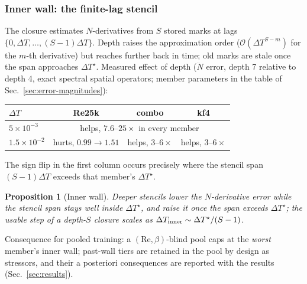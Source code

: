 \documentclass[11pt]{article}
\theoremstyle{plain}
\newtheorem{proposition}{Proposition}
\theoremstyle{definition}
\newcommand{\Nddot}{\ddot{N}}
\newcommand{\bO}{\mathcal{O}}
\newcommand{\DT}{\Delta T}
\newcommand{\DTs}{\Delta T^{\star}}
\begin{document}
\subsubsection{Inner wall: the finite-lag stencil}
\label{sec:inner-wall}
The closure estimates $N$-derivatives from $S$ stored marks at lags
$\{0,\DT,\dots,(S-1)\DT\}$. Depth raises the approximation order
($\bO(\DT^{S-m})$ for the $m$-th derivative) but reaches further back in time;
old marks are stale once the span approaches $\DTs$. Measured effect of
depth ($\Nddot$ error, depth 7 relative to depth 4, exact spectral spatial
operators; member parameters in the table of
Sec.~\ref{sec:error-magnitudes}):
\begin{center}\small
\begin{tabular}{lccc}
\toprule
$\DT$ & Re25k & combo & kf4\\
\midrule
$5\times10^{-3}$   & \multicolumn{3}{c}{helps, $7.6$--$25\times$ in every member}\\
$1.5\times10^{-2}$ & hurts, $0.99\to1.51$ & helps, $3$--$6\times$ & helps, $3$--$6\times$\\
\bottomrule
\end{tabular}
\end{center}
The sign flip in the first column occurs precisely where the stencil span
$(S{-}1)\DT$ exceeds that member's $\DTs$.

\begin{proposition}[Inner wall]
\label{prop:inner}
Deeper stencils lower the $N$-derivative error while the stencil span stays
well inside $\DTs$, and raise it once the span exceeds $\DTs$; the usable step
of a depth-$S$ closure scales as $\DT_{\rm inner}\sim\DTs/(S-1)$.
\end{proposition}
\noindent Consequence for pooled training: a $(\mathrm{Re},\beta)$-blind pool
caps at the \emph{worst} member's inner wall; past-wall tiers are retained in
the pool by design as stressors, and their a posteriori consequences are
reported with the results (Sec.~\ref{sec:results}).
\end{document}
